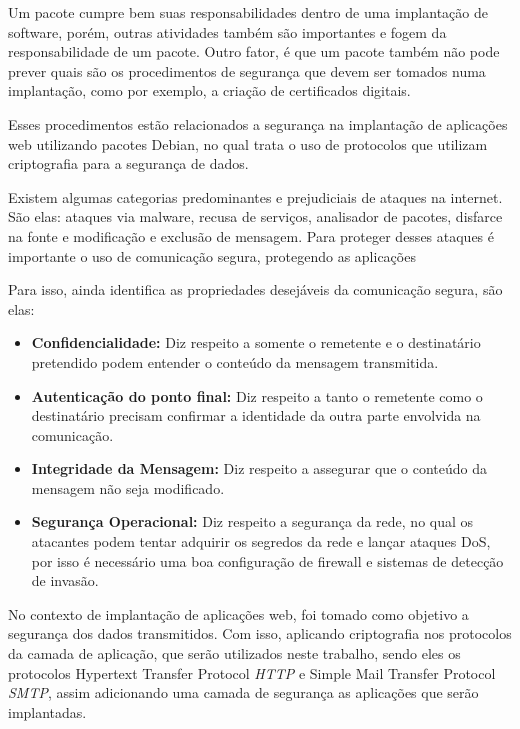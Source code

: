 Um pacote cumpre bem suas responsabilidades dentro de uma implantação de
software, porém, outras atividades também são importantes e fogem da responsabilidade 
de um pacote. Outro fator, é que um pacote também não pode prever quais são
os procedimentos de segurança que devem ser tomados numa implantação, como por 
exemplo, a criação de certificados digitais. 

Esses procedimentos estão relacionados a segurança na implantação de aplicações web 
utilizando pacotes Debian, no qual trata o uso de protocolos que utilizam criptografia
para a segurança de dados.

Existem algumas categorias predominantes e prejudiciais de ataques na internet. São elas: 
ataques via malware, recusa de serviços, analisador
de pacotes, disfarce na fonte e modificação e exclusão de mensagem. Para proteger
desses ataques é importante o uso de comunicação segura, protegendo as aplicações 
\cite{kurose2010redes} 

Para isso,  ainda identifica as propriedades 
desejáveis da comunicação segura, são elas:

\begin{itemize}
  \item \textbf{Confidencialidade:} Diz respeito a somente o remetente e o destinatário
  pretendido podem entender o conteúdo da mensagem transmitida.
  \item \textbf{Autenticação do ponto final:} Diz respeito a tanto o remetente como o destinatário
  precisam confirmar a identidade da outra parte envolvida na comunicação.
  \item \textbf{Integridade da Mensagem:} Diz respeito a assegurar que o conteúdo
  da mensagem não seja modificado.
  \item \textbf{Segurança Operacional:} Diz respeito a segurança da rede, no qual
  os atacantes podem tentar adquirir os segredos da rede e lançar ataques DoS,
  por isso é necessário uma boa configuração de firewall e sistemas de detecção
  de invasão.
\end{itemize}

No contexto de implantação de aplicações web, foi tomado como objetivo a segurança
dos dados transmitidos. Com isso, aplicando criptografia nos protocolos da camada
de aplicação, que serão utilizados neste trabalho, sendo eles os protocolos 
Hypertext Transfer Protocol \textit{HTTP} e Simple Mail Transfer Protocol 
\textit{SMTP}, assim adicionando uma camada de segurança as aplicações que serão implantadas.

